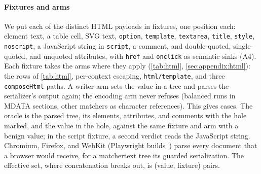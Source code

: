\paragraph{Fixtures and arms}
We put each of the \dataHtmlPayloads distinct HTML payloads in \dataHtmlHosts
fixtures, one position each: element text, a table cell, SVG text, \texttt{option},
\texttt{template}, \texttt{textarea}, \texttt{title}, \texttt{style},
\texttt{noscript}, a JavaScript string in \texttt{script}, a comment, and
double-quoted, single-quoted, and unquoted attributes, with \texttt{href} and
\texttt{onclick} as semantic sinks (A4).
Each fixture takes the \dataHtmlArms arms where they apply (\cref{tab:html},
\cref{sec:appendix:html}): the rows of \cref{tab:html}, per-context escaping,
\texttt{html/template}, and three \texttt{composeHtml} paths. A writer arm sets
the value in a tree and parses the serializer's output again; the encoding arm
never refuses (balanced runs in MDATA sections, other matchers as character
references). This gives \dataHtmlCases cases.
The oracle is the parsed tree, its elements, attributes, and comments with the hole
marked, and the value in the hole, against the same fixture and arm with a benign
value; in the script fixture, a second verdict reads the JavaScript string.
Chromium, Firefox, and WebKit (Playwright \dataPlaywrightVersion
builds~\cite{playwright}) parse every document that a browser would receive,
for a matchertext tree its guarded serialization. The effective set, where concatenation breaks out, is
\dataHtmlEffective (value, fixture) pairs.

\begin{table}[t]
\centering
\caption{Parsed outcome by delivery path over the \dataHtmlPayloads HTML payloads
in the fixtures that are not semantic sinks. Without matchertext, the stock paths
admit breakouts and the guard of the fork serializer only refuses; with
matchertext (lower block), no path admits a breakout, in parse5 or in a browser,
which reads the guarded serialization.
: the structure is kept but
the hole holds another value; : \textsc{Verify} or the
serializer refuses the value; : the most
breakouts in one of three browsers.}
\label{tab:html}
\small
\setlength{\tabcolsep}{3pt}

\end{table}

